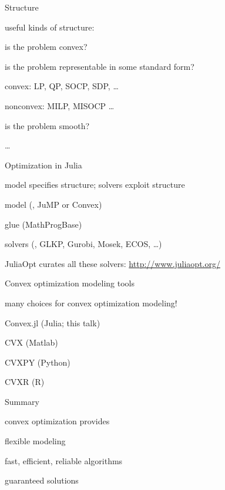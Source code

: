 \documentclass[presentation]{beamer}
\begin{document}
\begin{frame}{Structure}

useful kinds of structure:
\bit
\item is the problem convex?
\item is the problem representable in some standard form?
\bit
\item convex: LP, QP, SOCP, SDP, \ldots
\item nonconvex: MILP, MISOCP \ldots
\eit
\item is the problem smooth?
\item \ldots
\eit

\end{frame}

\begin{frame}{Optimization in Julia}

model specifies structure; solvers exploit structure
\bit
\item model (\eg, JuMP or Convex)
\item glue (MathProgBase)
\item solvers (\eg, GLKP, Gurobi, Mosek, ECOS, \ldots)
\eit

JuliaOpt curates all these solvers: \url{http://www.juliaopt.org/}

\end{frame}
\begin{frame}{Convex optimization modeling tools}

many choices for convex optimization modeling!
\bit
\item Convex.jl (Julia; this talk)
\item CVX (Matlab)
\item CVXPY (Python)
\item CVXR (R)
\eit

\end{frame}

\begin{frame}{Summary}

convex optimization provides
\bit
\item flexible modeling
\item fast, efficient, reliable algorithms
\item guaranteed solutions
\eit

\end{frame}
\end{document}
